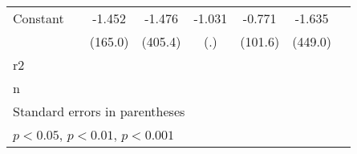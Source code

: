 {\begin{tabular}{l*{7}{c}}
Constant                      &                   &    -1.452         &    -1.476         &    -1.031         &    -0.771         &    -1.635         &                   \\
                              &                   &   (165.0)         &   (405.4)         &       (.)         &   (101.6)         &   (449.0)         &                   \\
\hline
r2                            &                   &                   &                   &                   &                   &                   &                   \\
n                             &                   &                   &                   &                   &                   &                   &                   \\
\hline\hline
\multicolumn{8}{l}{\footnotesize Standard errors in parentheses}\\
\multicolumn{8}{l}{\footnotesize \sym{*} \(p<0.05\), \sym{**} \(p<0.01\), \sym{***} \(p<0.001\)}\\
\end{tabular}
}
